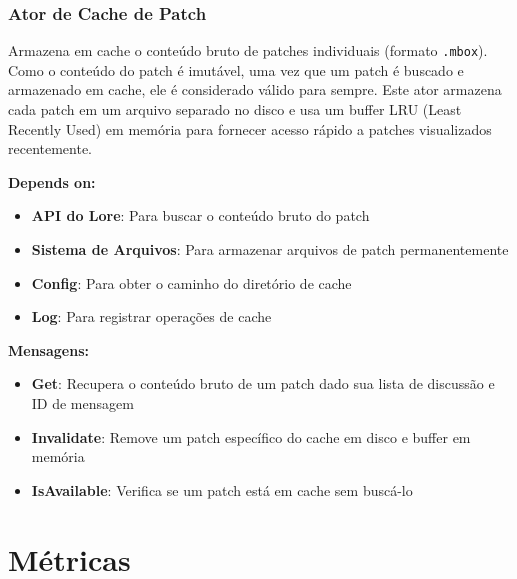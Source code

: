 \subsubsection{Ator de Cache de Patch}

Armazena em cache o conteúdo bruto de patches individuais (formato \texttt{.mbox}). Como o conteúdo do patch é imutável, uma vez que um patch é buscado e armazenado em cache, ele é considerado válido para sempre. Este ator armazena cada patch em um arquivo separado no disco e usa um buffer LRU (Least Recently Used) em memória para fornecer acesso rápido a patches visualizados recentemente.

\textbf{Depends on:}

\begin{itemize}
    \item \textbf{API do Lore}: Para buscar o conteúdo bruto do patch
    \item \textbf{Sistema de Arquivos}: Para armazenar arquivos de patch permanentemente
    \item \textbf{Config}: Para obter o caminho do diretório de cache
    \item \textbf{Log}: Para registrar operações de cache
\end{itemize}

\textbf{Mensagens:}

\begin{itemize}
    \item \textbf{Get}: Recupera o conteúdo bruto de um patch dado sua lista de discussão e ID de mensagem
    \item \textbf{Invalidate}: Remove um patch específico do cache em disco e buffer em memória
    \item \textbf{IsAvailable}: Verifica se um patch está em cache sem buscá-lo
\end{itemize}

\section{Métricas}


